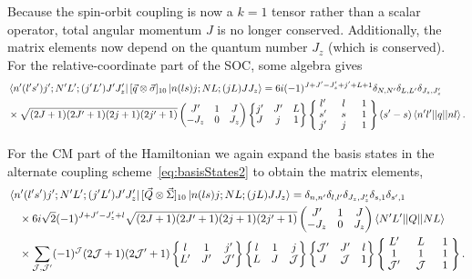 \documentclass[%
 notitlepage,
 preprint,
showpacs,%
 amsmath,amssymb,
 aps,
pra,
]{revtex4-1}
\newcommand{\threej}[6]{ \begin{pmatrix}
  #1 & #2 & #3 \\
  #4 & #5 & #6 
 \end{pmatrix}}
\newcommand{\sixj}[6]{ \begin{Bmatrix}
  #1 & #2 & #3 \\
  #4 & #5 & #6 
 \end{Bmatrix}}
\newcommand{\ninej}[9]{ \begin{Bmatrix}
  #1 & #2 & #3 \\
  #4 & #5 & #6 \\
  #7 & #8 & #9
 \end{Bmatrix}}
\begin{document}
Because the spin-orbit coupling is now a $k=1$ tensor rather than a scalar operator, total angular momentum $J$ is no longer conserved. Additionally, the matrix elements now depend on the quantum number $J_z$ (which is conserved). For the relative-coordinate part of the SOC, some algebra gives
\begin{equation}\begin{split}
&\bra{n'(l's')j';N'L';(j'L')J'J'_z}  [ \vec{q} \otimes \vec{\sigma} ]_{10}  \ket{n(ls)j;NL;(jL)JJ_z} =6 i (-1)^{J+J'-J'_z+j'+L+1}\delta_{N,N'}\delta_{L,L'}\delta_{J_z,J'_z} \\
 &\times\sqrt{(2J+1)(2J'+1)(2j+1)(2j'+1)} \threej{J'}{1}{J}{-J_z}{0}{J_z} \sixj{j'}{J'}{L}{J}{j}{1}
 \renewcommand{\arraystretch}{0.9}
 \ninej{\hphantom{l}l'\hphantom{l}}{\hphantom{l}l\hphantom{l}}{\hphantom{l}1\hphantom{l}}{s'}{s}{1}{j'}{j}{1} (s'-s) \braket{n'l' || q || n l}.
\end{split}
\end{equation}

For the CM part of the Hamiltonian we again expand the basis states in the alternate coupling scheme~\eqref{eq:basisStates2} to obtain the matrix elements,
\begin{equation}\begin{split}
&\bra{n'(l's')j';N'L';(j'L')J'J'_z} [ \vec{Q} \otimes \vec{\Sigma} ]_{10}  \ket{n(ls)j;NL;(jL)JJ_z} = \delta_{n,n'}\delta_{l,l'}\delta_{J_z,J'_z}\delta_{s,1}\delta_{s',1} \\
 &\quad\times 6 i \sqrt{2}(-1)^{J+J'-J'_z+l} \sqrt{(2J+1)(2J'+1)(2j+1)(2j'+1)} \threej{J'}{1}{J}{-J_z}{0}{J_z}  \braket{N' L' || Q || N L} \\ 
 &\quad\times\sum_{\mathcal{J},\mathcal{J}'} (-1)^\mathcal{J}(2\mathcal{J}+1)(2\mathcal{J}'+1)\sixj{l}{1}{j'}{L'}{J'}{\mathcal{J}'}\sixj{l}{1}{j}{L}{J}{\mathcal{J}}\sixj{\mathcal{J}'}{J'}{l}{J}{\mathcal{J}}{1}
 \renewcommand{\arraystretch}{0.9}
 \ninej{\hphantom{l}L'\hphantom{l}}{\hphantom{l}L\hphantom{l}}{\hphantom{l}1\hphantom{l}}{1}{1}{1}{\mathcal{J}'}{\mathcal{J}}{1} .
\end{split}
\end{equation}
\end{document}
